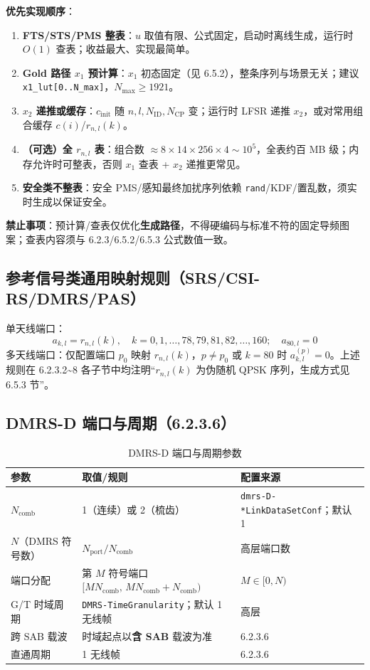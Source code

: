 \documentclass[11pt,a4paper]{ctexart}
\begin{document}
\textbf{优先实现顺序}：
\begin{enumerate}[nosep]
  \item \textbf{FTS/STS/PMS 整表}：$u$ 取值有限、公式固定，启动时离线生成，运行时 $O(1)$ 查表；收益最大、实现最简单。
  \item \textbf{Gold 路径 $x_1$ 预计算}：$x_1$ 初态固定（见 6.5.2），整条序列与场景无关；建议 \texttt{x1\_lut[0..N\_max]}，$N_{\max}\geq 1921$。
  \item \textbf{$x_2$ 递推或缓存}：$c_{\mathrm{init}}$ 随 $n,l,N_{\mathrm{ID}},N_{\mathrm{CP}}$ 变；运行时 LFSR 递推 $x_2$，或对常用组合缓存 $c(i)$/$r_{n,l}(k)$。
  \item \textbf{（可选）全 $r_{n,l}$ 表}：组合数 $\approx 8\times14\times256\times4 \sim 10^5$，全表约百 MB 级；内存允许时可整表，否则 $x_1$ 查表 + $x_2$ 递推更常见。
  \item \textbf{安全类不整表}：安全 PMS/感知最终加扰序列依赖 \texttt{rand}/KDF/置乱数，须实时生成以保证安全。
\end{enumerate}

\textbf{禁止事项}：预计算/查表仅优化\textbf{生成路径}，不得硬编码与标准不符的固定导频图案；查表内容须与 6.2.3/6.5.2/6.5.3 公式数值一致。

\subsection{参考信号类通用映射规则（SRS/CSI-RS/DMRS/PAS）}

单天线端口：
\begin{equation}
a_{k,l} = r_{n,l}(k), \quad k=0,1,\ldots,78,79,81,82,\ldots,160;\quad a_{80,l}=0
\end{equation}
多天线端口：仅配置端口 $p_0$ 映射 $r_{n,l}(k)$，$p{\neq}p_0$ 或 $k{=}80$ 时 $a_{k,l}^{(p)}{=}0$。上述规则在 6.2.3.2\textasciitilde 8 各子节中均注明``$r_{n,l}(k)$ 为伪随机 QPSK 序列，生成方式见 6.5.3 节''。

\subsection{DMRS-D 端口与周期（6.2.3.6）}

\begin{longtable}{lll}
\caption{DMRS-D 端口与周期参数} \\
\toprule
\textbf{参数} & \textbf{取值/规则} & \textbf{配置来源} \\
\midrule
$N_{\mathrm{comb}}$ & 1（连续）或 2（梳齿） & \texttt{dmrs-D-*LinkDataSetConf}；默认 1 \\
$N$（DMRS 符号数） & $N_{\mathrm{port}}/N_{\mathrm{comb}}$ & 高层端口数 \\
端口分配 & 第 $M$ 符号端口 $[M N_{\mathrm{comb}},\, M N_{\mathrm{comb}}+N_{\mathrm{comb}})$ & $M{\in}[0,N)$ \\
G/T 时域周期 & \texttt{DMRS-TimeGranularity}；默认 1 无线帧 & 高层 \\
跨 SAB 载波 & 时域起点以\textbf{含 SAB} 载波为准 & 6.2.3.6 \\
直通周期 & 1 无线帧 & 6.2.3.6 \\
\bottomrule
\end{longtable}
\end{document}
